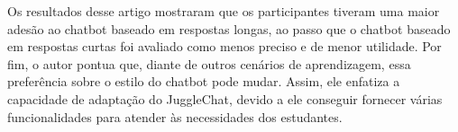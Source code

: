 \begin{figure}[ht] 
   	\captionsetup{width=16cm}
\end{figure}

Os resultados desse artigo mostraram que os participantes tiveram uma maior adesão ao chatbot baseado em respostas longas, ao passo que o chatbot baseado em respostas curtas foi avaliado como menos preciso e de menor utilidade. Por fim, o autor pontua que, diante de outros cenários de aprendizagem, essa preferência sobre o estilo do chatbot pode mudar. Assim, ele enfatiza a capacidade de adaptação do JuggleChat, devido a ele conseguir fornecer várias funcionalidades para atender às necessidades dos estudantes.